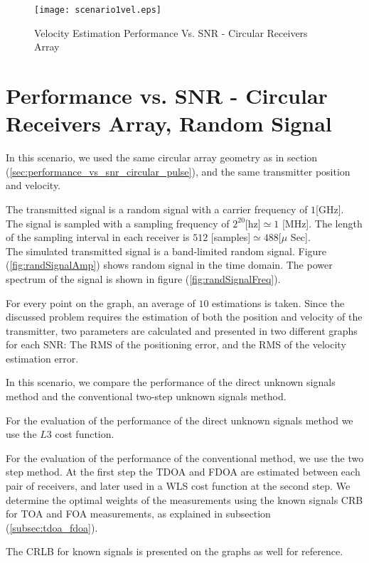 \begin{figure}
\begin{center}
\texttt{[image: scenario1vel.eps]} 
\end{center}
\caption{Velocity Estimation Performance Vs. SNR - Circular Receivers Array}
\label{fig:scenario1_vel_rms}
\end{figure}

\section{Performance vs. SNR - Circular Receivers Array, Random Signal}

In this scenario, we used the same circular array geometry as in section (\ref{sec:performance_vs_snr_circular_pulse}), and the same transmitter position and velocity.

The transmitted signal is a random signal with a carrier frequency of $1$[GHz].
The signal is sampled with a sampling frequency of $2^{20}$[hz]$ \simeq 1$ [MHz].
The length of the sampling interval in each receiver is $512$ [samples]$ \simeq 488 $[$\mu$ Sec].\\
The simulated transmitted signal is a band-limited random signal.
Figure (\ref{fig:randSignalAmp}) shows random signal in the time domain. The power spectrum of the signal is shown in figure (\ref{fig:randSignalFreq}).

For every point on the graph, an average of $10$ estimations is taken.
Since the discussed problem requires the estimation of both the position and velocity of the transmitter, two parameters are calculated and presented in two different graphs for each SNR: The RMS of the positioning error, and the RMS of the velocity estimation error.

In this scenario, we compare the performance of the direct unknown signals method and the conventional two-step unknown signals method.

For the evaluation of the performance of the direct unknown signals method we use the $L3$ cost function.

For the evaluation of the performance of the conventional method, we use the two step method.
At the first step the TDOA and FDOA are estimated between each pair of receivers, and later used in a WLS cost function at the second step. We determine the optimal weights of the measurements using the known signals CRB for TOA and FOA measurements, as explained in subsection (\ref{subsec:tdoa_fdoa}).

The CRLB for known signals is presented on the graphs as well for reference.


